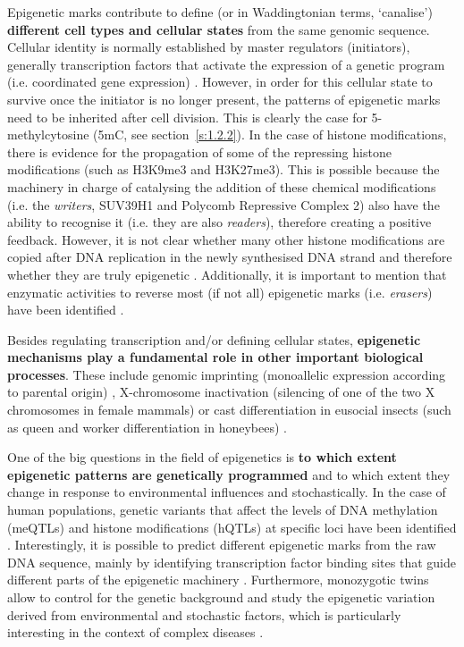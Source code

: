 Epigenetic marks contribute to define (or in Waddingtonian terms, `canalise') \textbf{different cell types and cellular states} from the same genomic sequence. Cellular identity is normally established by master regulators (initiators), generally transcription factors that activate the expression of a genetic program (i.e. coordinated gene expression) \cite{Reinberg2018}. However, in order for this cellular state to survive once the initiator is no longer present, the patterns of epigenetic marks need to be inherited after cell division. This is clearly the case for 5-methylcytosine (\acrshort{5mC}, see section~\ref{s:1.2.2}). In the case of histone modifications, there is evidence for the propagation of some of the repressing histone modifications (such as H3K9me3 and H3K27me3). This is possible because the machinery in charge of catalysing the addition of these chemical modifications (i.e. the \textit{writers}, SUV39H1 and Polycomb Repressive Complex 2) also have the ability to recognise it (i.e. they are also \textit{readers}), therefore creating a positive feedback. However, it is not clear whether many other histone modifications are copied after DNA replication in the newly synthesised DNA strand and therefore whether they are truly epigenetic \cite{Reinberg2018}. Additionally, it is important to mention that enzymatic activities to reverse most (if not all) epigenetic marks (i.e. \textit{erasers}) have been identified \cite{Allis2016}.

\bigskip

Besides regulating transcription and/or defining cellular states, \textbf{epigenetic mechanisms play a fundamental role in other important biological processes}. These include genomic imprinting (monoallelic expression according to parental origin) \cite{Peters2014}, X-chromosome inactivation (silencing of one of the two X chromosomes in female mammals) \cite{Wutz2011} or cast differentiation in eusocial insects (such as queen and worker differentiation in honeybees) \cite{Patalano2012}.

\bigskip

One of the big questions in the field of epigenetics is \textbf{to which extent epigenetic patterns are genetically programmed} and to which extent they change in response to environmental influences and stochastically. In the case of human populations, genetic variants that affect the levels of DNA methylation (\acrshort{meQTLs}) and histone modifications (\acrshort{hQTLs}) at specific loci have been identified \cite{Taudt2016}. Interestingly, it is possible to predict different epigenetic marks from the raw DNA sequence, mainly by identifying transcription factor binding sites that guide different parts of the epigenetic machinery \cite{Whitaker2014}. Furthermore, monozygotic twins allow to control for the genetic background and study the epigenetic variation derived from environmental and stochastic factors, which is particularly interesting in the context of complex diseases \cite{Castillo-Fernandez2014}.

